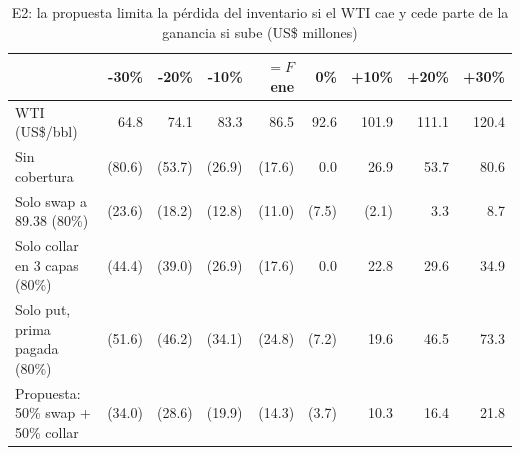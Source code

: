 \begin{table}[htbp]\centering\small
\caption{E2: la propuesta limita la pérdida del inventario si el WTI cae y cede parte de la ganancia si sube (US\$ millones)}\label{tab:e2-escenarios}
\begin{tabular}{lrrrrrrrr}
\toprule
 & \textbf{-30\%} & \textbf{-20\%} & \textbf{-10\%} & \textbf{$=F$ ene} & \textbf{0\%} & \textbf{+10\%} & \textbf{+20\%} & \textbf{+30\%} \\
\midrule
WTI (US\$/bbl) & 64.8 & 74.1 & 83.3 & 86.5 & 92.6 & 101.9 & 111.1 & 120.4 \\
Sin cobertura & (80.6) & (53.7) & (26.9) & (17.6) & 0.0 & 26.9 & 53.7 & 80.6 \\
Solo swap a 89.38 (80\%) & (23.6) & (18.2) & (12.8) & (11.0) & (7.5) & (2.1) & 3.3 & 8.7 \\
Solo collar en 3 capas (80\%) & (44.4) & (39.0) & (26.9) & (17.6) & 0.0 & 22.8 & 29.6 & 34.9 \\
Solo put, prima pagada (80\%) & (51.6) & (46.2) & (34.1) & (24.8) & (7.2) & 19.6 & 46.5 & 73.3 \\
Propuesta: 50\% swap + 50\% collar & (34.0) & (28.6) & (19.9) & (14.3) & (3.7) & 10.3 & 16.4 & 21.8 \\
\bottomrule
\end{tabular}
\end{table}
